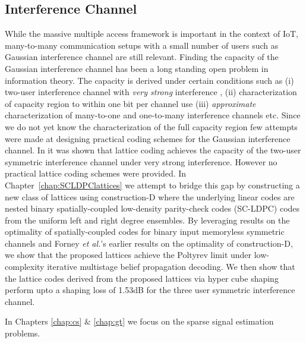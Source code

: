 \subsection*{Interference Channel}
While the massive multiple access framework is important in the context of IoT, many-to-many communication setups with a small number of users such as Gaussian interference channel are still relevant. Finding the capacity of the Gaussian interference channel has been a long standing open problem in information theory\cite{cover2012elements}. The capacity is derived under certain conditions such as (i) two-user interference channel with \textit{very strong} interference \cite{carleial1978interference,sato1981capacity}, (ii) characterization of capacity region to within one bit per channel use \cite{etkin2008gaussian} (iii) \textit{approximate} characterization of many-to-one and one-to-many interference channels etc. Since we do not yet know the characterization of the full capacity region few attempts were made at designing practical coding schemes for the Gaussian interference channel. In \cite{sridharan2008capacity} it was shown that lattice coding achieves the capacity of the two-user symmetric interference channel under very strong interference. However no practical lattice coding schemes were provided. In Chapter~\ref{chap:SCLDPClattices} we attempt to bridge this gap by constructing a new class of lattices using construction-D where the underlying linear codes are nested binary spatially-coupled low-density parity-check codes (SC-LDPC) codes from the uniform left and right degree ensembles. By leveraging results on the optimality of spatially-coupled codes for binary input memoryless symmetric channels and Forney {\em et al.}'s earlier results on the optimality of construction-D, we show that the proposed lattices achieve the Poltyrev limit under low-complexity iterative multistage belief propagation decoding. We then show that the lattice codes derived from the proposed lattices via hyper cube shaping perform upto a shaping loss of 1.53dB for the three user symmetric interference channel. 


In Chapters \ref{chap:cs} $\&$ \ref{chap:gt} we focus on the sparse signal estimation problems.
\vspace{-2pt}
